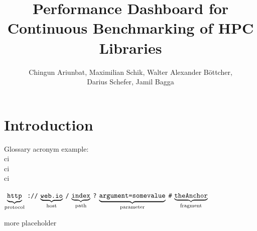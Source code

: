 \documentclass[parskip=full,11pt]{scrartcl}
\title{Performance Dashboard for Continuous Benchmarking of HPC Libraries}
\author{Chingun Ariunbat, Maximilian Schik, Walter Alexander B\"ottcher,\\ Darius Schefer, Jamil Bagga}
\newcommand\urlpart[2]{$\underbrace{\text{\texttt{#1}}}_{\text{#2}}$}
\begin{document}
\maketitle

\section{Introduction}
Glossary acronym example: \\
\acrshort{ci} \\
\acrlong{ci} \\
\acrfull{ci}

\begin{center}
\urlpart{http}{protocol}%
\texttt{://}%
\urlpart{web.io}{host}%
\texttt{/}%
\urlpart{index}{path}%
\texttt{?}%
\urlpart{argument=somevalue}{parameter}%
\texttt{\#}%
\urlpart{theAnchor}{fragment}
\end{center}

more placeholder


\clearpage


\clearpage


\clearpage

\appendix


\printnoidxglossaries
\end{document}
